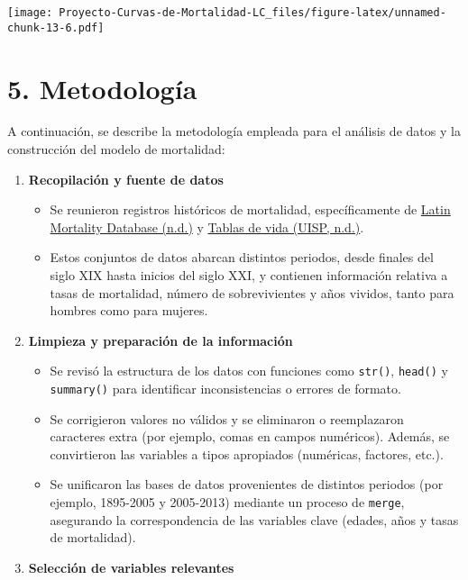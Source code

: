 \documentclass[
]{article}
\providecommand{\tightlist}{%
  \setlength{\itemsep}{0pt}\setlength{\parskip}{0pt}}
\begin{document}
\texttt{[image: Proyecto-Curvas-de-Mortalidad-LC\_files/figure-latex/unnamed-chunk-13-6.pdf]}

\hypertarget{metodologuxeda}{%
\section{5. Metodología}\label{metodologuxeda}}

A continuación, se describe la metodología empleada para el análisis de
datos y la construcción del modelo de mortalidad:

\begin{enumerate}
\def\labelenumi{\arabic{enumi}.}
\tightlist
\item
  \textbf{Recopilación y fuente de datos}

  \begin{itemize}
  \tightlist
  \item
    Se reunieron registros históricos de mortalidad, específicamente de
    \href{https://www.ssc.wisc.edu/cdha/latinmortality2/?page_id=28}{Latin
    Mortality Database (n.d.)} y
    \href{https://uisp.insp.mx/wp/index.php/tablas-de-vida/}{Tablas de
    vida (UISP, n.d.)}.\\
  \item
    Estos conjuntos de datos abarcan distintos periodos, desde finales
    del siglo XIX hasta inicios del siglo XXI, y contienen información
    relativa a tasas de mortalidad, número de sobrevivientes y años
    vividos, tanto para hombres como para mujeres.
  \end{itemize}
\item
  \textbf{Limpieza y preparación de la información}

  \begin{itemize}
  \tightlist
  \item
    Se revisó la estructura de los datos con funciones como
    \texttt{str()}, \texttt{head()} y \texttt{summary()} para
    identificar inconsistencias o errores de formato.\\
  \item
    Se corrigieron valores no válidos y se eliminaron o reemplazaron
    caracteres extra (por ejemplo, comas en campos numéricos). Además,
    se convirtieron las variables a tipos apropiados (numéricas,
    factores, etc.).\\
  \item
    Se unificaron las bases de datos provenientes de distintos periodos
    (por ejemplo, 1895-2005 y 2005-2013) mediante un proceso de
    \texttt{merge}, asegurando la correspondencia de las variables clave
    (edades, años y tasas de mortalidad).
  \end{itemize}
\item
  \textbf{Selección de variables relevantes}


\end{enumerate}
\end{document}
